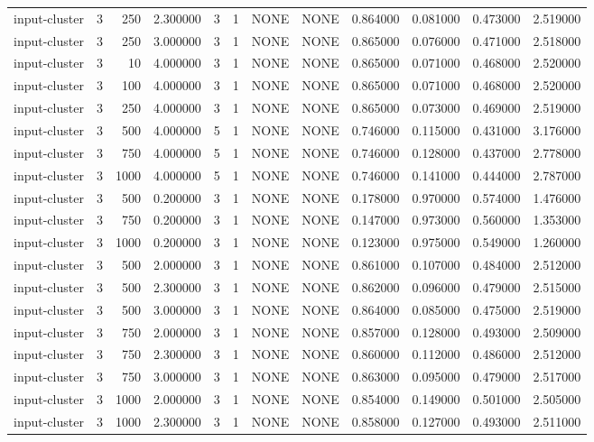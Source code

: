 \begin{tabular}{lrrrllllrrrr}
input-cluster & 3 & 250 & 2.300000 & 3 & 1 & NONE & NONE & 0.864000 & 0.081000 & 0.473000 & 2.519000 \\
input-cluster & 3 & 250 & 3.000000 & 3 & 1 & NONE & NONE & 0.865000 & 0.076000 & 0.471000 & 2.518000 \\
input-cluster & 3 & 10 & 4.000000 & 3 & 1 & NONE & NONE & 0.865000 & 0.071000 & 0.468000 & 2.520000 \\
input-cluster & 3 & 100 & 4.000000 & 3 & 1 & NONE & NONE & 0.865000 & 0.071000 & 0.468000 & 2.520000 \\
input-cluster & 3 & 250 & 4.000000 & 3 & 1 & NONE & NONE & 0.865000 & 0.073000 & 0.469000 & 2.519000 \\
input-cluster & 3 & 500 & 4.000000 & 5 & 1 & NONE & NONE & 0.746000 & 0.115000 & 0.431000 & 3.176000 \\
input-cluster & 3 & 750 & 4.000000 & 5 & 1 & NONE & NONE & 0.746000 & 0.128000 & 0.437000 & 2.778000 \\
input-cluster & 3 & 1000 & 4.000000 & 5 & 1 & NONE & NONE & 0.746000 & 0.141000 & 0.444000 & 2.787000 \\
input-cluster & 3 & 500 & 0.200000 & 3 & 1 & NONE & NONE & 0.178000 & 0.970000 & 0.574000 & 1.476000 \\
input-cluster & 3 & 750 & 0.200000 & 3 & 1 & NONE & NONE & 0.147000 & 0.973000 & 0.560000 & 1.353000 \\
input-cluster & 3 & 1000 & 0.200000 & 3 & 1 & NONE & NONE & 0.123000 & 0.975000 & 0.549000 & 1.260000 \\
input-cluster & 3 & 500 & 2.000000 & 3 & 1 & NONE & NONE & 0.861000 & 0.107000 & 0.484000 & 2.512000 \\
input-cluster & 3 & 500 & 2.300000 & 3 & 1 & NONE & NONE & 0.862000 & 0.096000 & 0.479000 & 2.515000 \\
input-cluster & 3 & 500 & 3.000000 & 3 & 1 & NONE & NONE & 0.864000 & 0.085000 & 0.475000 & 2.519000 \\
input-cluster & 3 & 750 & 2.000000 & 3 & 1 & NONE & NONE & 0.857000 & 0.128000 & 0.493000 & 2.509000 \\
input-cluster & 3 & 750 & 2.300000 & 3 & 1 & NONE & NONE & 0.860000 & 0.112000 & 0.486000 & 2.512000 \\
input-cluster & 3 & 750 & 3.000000 & 3 & 1 & NONE & NONE & 0.863000 & 0.095000 & 0.479000 & 2.517000 \\
input-cluster & 3 & 1000 & 2.000000 & 3 & 1 & NONE & NONE & 0.854000 & 0.149000 & 0.501000 & 2.505000 \\
input-cluster & 3 & 1000 & 2.300000 & 3 & 1 & NONE & NONE & 0.858000 & 0.127000 & 0.493000 & 2.511000 \\

\end{tabular}
